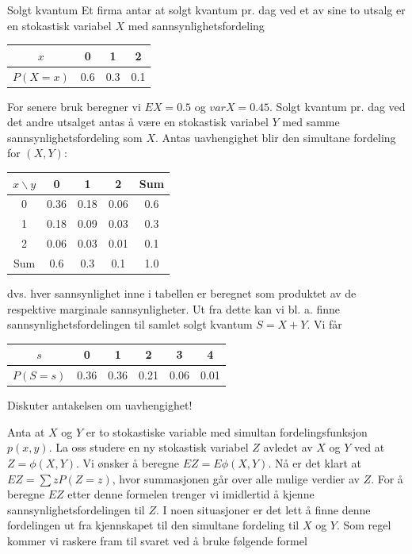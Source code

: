 \begin{eksempel}{Solgt kvantum}
Et firma antar at solgt kvantum pr. dag ved et av sine to utsalg
er en stokastisk variabel $X$ med sannsynlighetsfordeling

\begin{center}
 \begin{tabular}{c|ccc}
 $x$ & 0 & 1 & 2 \\ \hline
 $P(X=x)$ & 0.6 & 0.3 & 0.1
 \end{tabular} \end{center}

\noindent For senere bruk beregner vi $EX=0.5$ og $varX=0.45$. Solgt
kvantum pr. dag ved det andre utsalget antas å være en stokastisk
variabel $Y$ med samme sannsynlighetsfordeling som $X$. Antas
uavhengighet blir den simultane fordeling for $(X, Y)$:

\begin{center}
 \begin{tabular}{|c|ccc|c|} \hline
 $x\backslash y$ & 0 & 1 & 2 & Sum \\ \hline
  0  & 0.36 & 0.18 & 0.06 & 0.6 \\
  1  & 0.18 & 0.09 & 0.03 & 0.3 \\
  2  & 0.06 & 0.03 & 0.01 & 0.1 \\ \hline
 Sum & 0.6 & 0.3 & 0.1 & 1.0  \\ \hline
 \end{tabular} \end{center}

\noindent dvs. hver sannsynlighet inne i tabellen er beregnet som produktet
av de respektive marginale sannsynligheter. Ut fra dette kan vi
bl. a. finne sannsynlighetsfordelingen til samlet solgt kvantum
$S=X+Y$. Vi får

\begin{center}
 \begin{tabular}{c|ccccc}
 $s$ & 0 & 1 & 2 & 3 & 4 \\ \hline
 $P(S=s)$&0.36&0.36&0.21&0.06&0.01
 \end{tabular} \end{center}

\noindent Diskuter antakelsen om uavhengighet!
\end{eksempel}

Anta at $X$ og $Y$ er to stokastiske variable med simultan
fordelingsfunksjon $p(x,y)$. La oss studere en ny stokastisk
variabel $Z$ avledet av $X$ og $Y$ ved at $Z=\phi (X,Y)$. Vi
ønsker å beregne $EZ=E\phi (X,Y)$. Nå er det klart at $EZ=\sum
zP(Z=z)$, hvor summasjonen går over alle mulige verdier av $Z$.
For å beregne $EZ$ etter denne formelen trenger vi imidlertid å
kjenne sannsynlighetsfordelingen til $Z$. I noen situasjoner er
det lett å finne denne fordelingen ut fra kjennskapet til den
simultane fordeling til $X$ og $Y$. Som regel kommer vi raskere
fram til svaret ved å bruke følgende formel

